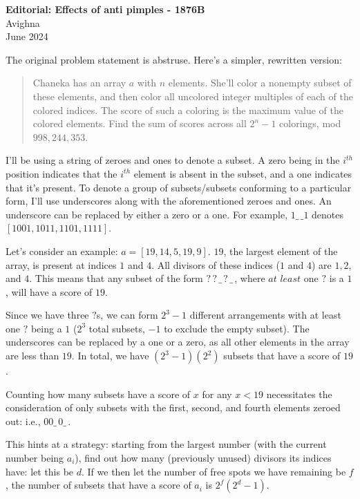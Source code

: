 \documentclass{article}
\begin{document}
\begin{center}
  \large{\textbf{Editorial: Effects of anti pimples - 1876B}}\\
  \vspace{0.2em}
  \large{Avighna}\\
  \vspace{0.2em}
  \large{June 2024}
\end{center}

The original problem statement is abstruse. Here's a simpler, rewritten version:
\begin{quote}
Chaneka has an array $a$ with $n$ elements. She'll color a nonempty subset of these elements, and then color all uncolored integer multiples of each of the colored indices. The score of such a coloring is the maximum value of the colored elements. Find the sum of scores across all $2^n-1$ colorings, mod $998,244,353$.
\end{quote}

I'll be using a string of zeroes and ones to denote a subset. A zero being in the $i^{th}$ position indicates that the $i^{th}$ element is absent in the subset, and a one indicates that it's present. To denote a group of subsets/subsets conforming to a particular form, I'll use underscores along with the aforementioned zeroes and ones. An underscore can be replaced by either a zero or a one. For example, $1\_\,\_1$ denotes $[1001, 1011, 1101, 1111]$.

Let's consider an example: $a=[19,14,5,19,9]$. $19$, the largest element of the array, is present at indices $1$ and $4$. All divisors of these indices ($1$ and $4$) are $1,2$, and $4$. This means that any subset of the form $?\,?\,\_\,?\,\_\,$, where $\textit{at least}$ one $?$ is a $1$, will have a score of $19$.

Since we have three $?$s, we can form $2^3-1$ different arrangements with at least one $?$ being a $1$ ($2^3$ total subsets, $-1$ to exclude the empty subset). The underscores can be replaced by a one or a zero, as all other elements in the array are less than $19$. In total, we have $(2^3-1)(2^2)$ subsets that have a score of $19$.

Counting how many subsets have a score of $x$ for any $x<19$ necessitates the consideration of only subsets with the first, second, and fourth elements zeroed out: i.e., $00\_\,0\_\,$.

This hints at a strategy: starting from the largest number (with the current number being $a_i$), find out how many (previously unused) divisors its indices have: let this be $d$. If we then let the number of free spots we have remaining be $f$, the number of subsets that have a score of $a_i$ is $2^f(2^d-1)$.
\end{document}
